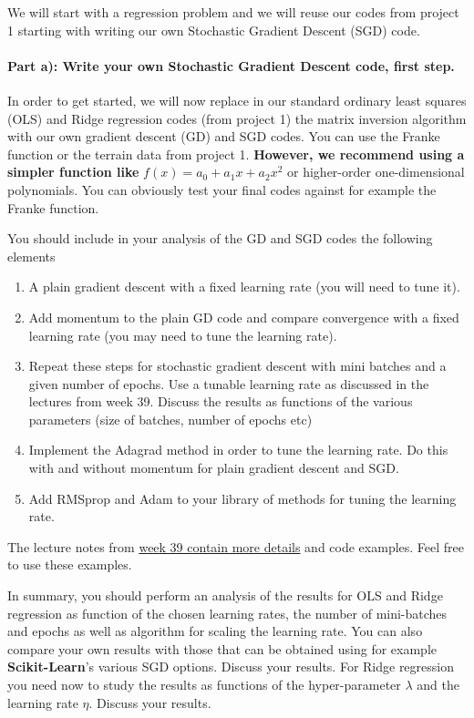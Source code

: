 \documentclass[%
oneside,                 %
final,                   %
10pt]{article}
\begin{document}
We will start with a regression problem and we will reuse our codes from project 1 starting with writing our own Stochastic Gradient Descent (SGD) code. 

\paragraph{Part a): Write your own Stochastic Gradient Descent  code, first step.}
In order to get started, we will now replace in our standard ordinary
least squares (OLS) and Ridge regression codes (from project 1) the
matrix inversion algorithm with our own gradient descent (GD) and SGD
codes.  You can use the Franke function or the terrain data from
project 1. \textbf{However, we recommend using a simpler function like}
$f(x)=a_0+a_1x+a_2x^2$ or higher-order one-dimensional polynomials.
You can obviously test your final codes against for example the Franke
function.

You should include in your analysis of the GD and SGD codes the following elements
\begin{enumerate}
\item A plain gradient descent with a fixed learning rate (you will need to tune it).

\item Add momentum to the plain GD code and compare convergence with a fixed learning rate (you may need to tune the learning rate).

\item Repeat these steps for stochastic gradient descent with mini batches and a given number of epochs. Use a tunable learning rate as discussed in the lectures from week 39. Discuss the results as functions of the various parameters (size of batches, number of epochs etc)

\item Implement the Adagrad method in order to tune the learning rate. Do this with and without momentum for plain gradient descent and SGD.

\item Add RMSprop and Adam to your library of methods for tuning the learning rate.
\end{enumerate}

\noindent
The lecture notes from \href{{https://compphysics.github.io/MachineLearning/doc/pub/week39/html/week39.html}}{week 39 contain more
details} and code examples. Feel free to use these examples.

In summary, you should 
perform an analysis of the results for OLS and Ridge regression as
function of the chosen learning rates, the number of mini-batches and
epochs as well as algorithm for scaling the learning rate. You can
also compare your own results with those that can be obtained using
for example \textbf{Scikit-Learn}'s various SGD options.  Discuss your
results. For Ridge regression you need now to study the results as functions of  the hyper-parameter $\lambda$ and 
the learning rate $\eta$.  Discuss your results.
\end{document}
